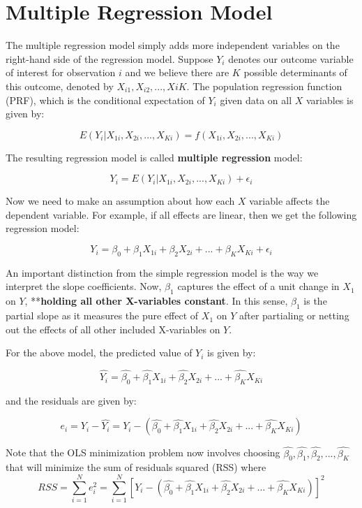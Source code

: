 \documentclass[
]{book}
\theoremstyle{definition}
\theoremstyle{definition}
\theoremstyle{definition}
\theoremstyle{definition}
\theoremstyle{remark}
\begin{document}
\hypertarget{multiple-regression-model-1}{%
\section{Multiple Regression Model}\label{multiple-regression-model-1}}

The multiple regression model simply adds more independent variables on the right-hand side of the regression model. Suppose \(Y_i\) denotes our outcome variable of interest for observation \(i\) and we believe there are \(K\) possible determinants of this outcome, denoted by \(X_{i1}, X_{i2},...,X{iK}\). The population regression function (PRF), which is the conditional expectation of \(Y_i\) given data on all \(X\) variables is given by:

\[E(Y_i|X_{1i},X_{2i},...,X_{Ki})=f(X_{1i},X_{2i},...,X_{Ki})\]

The resulting regression model is called \textbf{multiple regression} model:

\[Y_i=E(Y_i|X_{1i},X_{2i},...,X_{Ki})+\epsilon_i\]

Now we need to make an assumption about how each \(X\) variable affects the dependent variable. For example, if all effects are linear, then we get the following regression model:

\[Y_i=\beta_0 +\beta_1X_{1i} + \beta_2 X_{2i}+...+\beta_KX_{Ki}+\epsilon_i\]

An important distinction from the simple regression model is the way we interpret the slope coefficients. Now, \(\beta_1\) captures the effect of a unit change in \(X_1\) on \(Y\), **\textbf{holding all other X-variables constant}. In this sense, \(\beta_1\) is the partial slope as it measures the pure effect of \(X_1\) on \(Y\) after partialing or netting out the effects of all other included X-variables on \(Y\).

For the above model, the predicted value of \(Y_i\) is given by:

\[\hat{Y_i}=\hat{\beta_0} +\hat{\beta_1}X_{1i} + \hat{\beta_2} X_{2i}+...+\hat{\beta_K}X_{Ki}\]

and the residuals are given by:

\[e_i = Y_i- \hat{Y_i}= Y_i - (\hat{\beta_0} +\hat{\beta_1}X_{1i} + \hat{\beta_2} X_{2i}+...+\hat{\beta_K}X_{Ki})\]

Note that the OLS minimization problem now involves choosing \(\hat{\beta_0}, \hat{\beta_1}, \hat{\beta_2},..., \hat{\beta_K}\) that will minimize the sum of residuals squared (RSS) where
\[RSS=\sum_{i=1}^N e_i^2=\sum_{i=1}^N [Y_i - (\hat{\beta_0} +\hat{\beta_1}X_{1i} + \hat{\beta_2} X_{2i}+...+\hat{\beta_K}X_{Ki})]^2 \]
\end{document}
